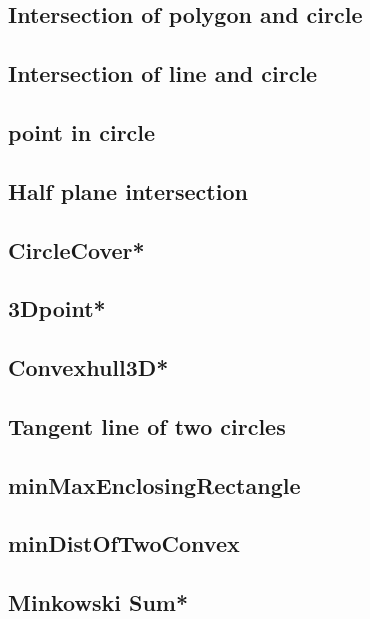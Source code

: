 \subsection{Intersection of polygon and circle}

\subsection{Intersection of line and circle}

\subsection{point in circle}

\subsection{Half plane intersection}

\subsection{CircleCover*} %

\subsection{3Dpoint*} %

\subsection{Convexhull3D*} %

\subsection{Tangent line of two circles}

\subsection{minMaxEnclosingRectangle}

\subsection{minDistOfTwoConvex}

\subsection{Minkowski Sum*} %

